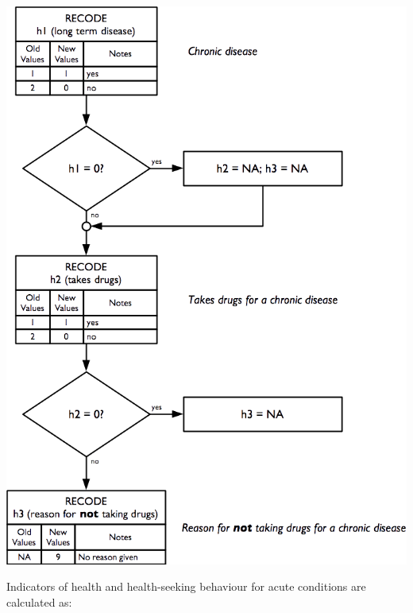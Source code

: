 \documentclass[12pt,a4paper]{book}
\theoremstyle{definition}
\theoremstyle{definition}
\theoremstyle{definition}
\theoremstyle{remark}
\begin{document}
\begin{center}\includegraphics{figures/indicators21} \end{center}

\newpage

Indicators of health and health-seeking behaviour for acute conditions
are calculated as:
\end{document}

